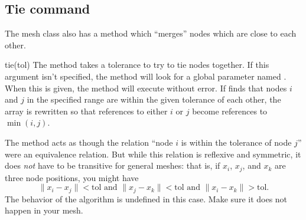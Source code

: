 \clearpage
\subsection{Tie command}
The mesh class also has a  method which ``merges'' nodes
which are close to each other.  
\begin{codelist}
  \item[tie(tol)] The  method takes a
  tolerance  to try to tie nodes together. If this argument isn't
  specified, the method will look for a global parameter named .
  When this is given, the method will execute without error.
  If  finds that nodes $i$ and $j$ in the specified range are
  within the given tolerance of each other, the  array is
  rewritten so that references to either $i$ or $j$ become references to
  $\min(i,j)$.
\end{codelist}

The  method acts as though the relation ``node $i$ is
within the tolerance of node $j$'' were an equivalence relation.  But
while this relation is reflexive and symmetric, it does \emph{not}
have to be transitive for general meshes: that is, if $x_i$, $x_j$,
and $x_k$ are three node positions, you might have
\[
  \|x_i - x_j\| < \mathrm{tol} \mbox{ and }
  \|x_j - x_k\| < \mathrm{tol} \mbox{ and }
  \|x_i - x_k\| > \mathrm{tol}.
\]
The behavior of the  algorithm is undefined in this case.
Make sure it does not happen in your mesh.


